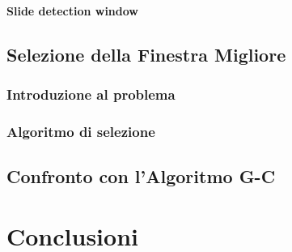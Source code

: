             \subsubsection{Slide detection window}
    \section{Selezione della Finestra Migliore} %
    \label{sec:best_detection_window}
        \subsection{Introduzione al problema}
        \subsection{Algoritmo di selezione}
    \section{Confronto con l'Algoritmo G-C} %
    \label{sec:gc_algorithm_comparison}

\chapter{Conclusioni}

